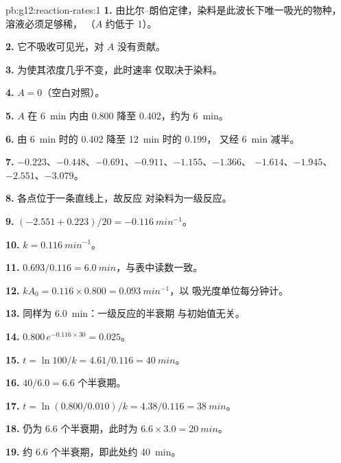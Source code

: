 \begin{solution}{pb:g12:reaction-rates:1}
\textbf{1.} 由比尔–朗伯定律，染料是此波长下唯一吸光的物种，
溶液必须足够稀，
（$A$ 约低于 1）。

\textbf{2.} 它不吸收可见光，对 $A$ 没有贡献。

\textbf{3.} 为使其浓度几乎不变，此时速率
仅取决于染料。

\textbf{4.} $A = 0$（空白对照）。

\textbf{5.} $A$ 在 \qty{6}{min} 内由 0.800 降至 0.402，约为
\qty{6}{min}。

\textbf{6.} 由 \qty{6}{min} 时的 0.402 降至 \qty{12}{min} 时的 0.199，
又经 \qty{6}{min} 减半。

\textbf{7.} $-0.223$、$-0.448$、$-0.691$、$-0.911$、$-1.155$、$-1.366$、
$-1.614$、$-1.945$、$-2.551$、$-3.079$。

\textbf{8.} 各点位于一条直线上，故反应
对染料为一级反应。

\textbf{9.} $(-2.551 + 0.223)/20 = \qty{-0.116}{min^{-1}}$。

\textbf{10.} $k = \qty{0.116}{min^{-1}}$。

\textbf{11.} $0.693 / 0.116 = \qty{6.0}{min}$，与表中读数一致。

\textbf{12.} $k A_0 = 0.116 \times 0.800 = \qty{0.093}{min^{-1}}$，以
吸光度单位每分钟计。

\textbf{13.} 同样为 \qty{6.0}{min}：一级反应的半衰期
与初始值无关。

\textbf{14.} $0.800\, e^{-0.116 \times 30} = 0.025$。

\textbf{15.} $t = \ln 100 / k = 4.61 / 0.116 = \qty{40}{min}$。

\textbf{16.} $40 / 6.0 = 6.6$ 个半衰期。

\textbf{17.} $t = \ln(0.800/0.010)/k = 4.38 / 0.116 = \qty{38}{min}$。

\textbf{18.} 仍为 6.6 个半衰期，此时为 $6.6 \times 3.0 = \qty{20}{min}$。

\textbf{19.} 约 6.6 个半衰期，即此处约 \qty{40}{min}。
\end{solution}
